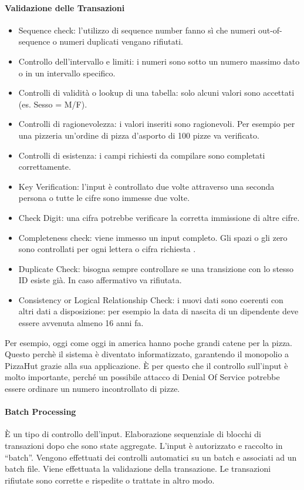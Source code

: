 \paragraph{Validazione delle Transazioni}
\begin{itemize}
	\item Sequence check: l'utilizzo di sequence number fanno sì che numeri
	out-of-sequence o numeri duplicati vengano rifiutati.
	\item Controllo dell'intervallo e limiti: i numeri sono sotto un numero
	massimo dato o in un intervallo specifico.
	\item Controlli di validità o lookup di una tabella:
	solo alcuni valori sono accettati (es. Sesso = M/F).
	\item Controlli di ragionevolezza: i valori inseriti sono ragionevoli.
	Per esempio per una pizzeria un'ordine di pizza d'asporto di 100 pizze
	va verificato.
	\item Controlli di esistenza: i campi richiesti da compilare
	sono completati correttamente.
	\item Key Verification: l'input è controllato due volte attraverso
	una seconda persona o tutte le cifre sono immesse due volte.
	\item Check Digit: una cifra potrebbe verificare la corretta
	immissione di altre cifre.
	\item Completeness check: viene immesso un input completo. Gli
	spazi o gli zero sono controllati per ogni lettera o cifra 
	richiesta .
	\item Duplicate Check: bisogna sempre controllare se una transizione
	con lo stesso ID esiste già. In caso affermativo va rifiutata.
	\item Consistency or Logical Relationship Check: i nuovi dati
	sono coerenti con altri dati a disposizione: per esempio
	la data di nascita di un dipendente deve essere avvenuta almeno
	16 anni fa.
\end{itemize}

Per esempio, oggi come oggi in america hanno poche grandi catene per la pizza.
Questo perchè il sistema è diventato informatizzato, garantendo il monopolio a
PizzaHut grazie alla sua applicazione. È per questo che il controllo sull'input 
è molto importante, perché un possibile attacco di Denial Of Service potrebbe 
essere ordinare un numero incontrollato di pizze.





\paragraph{Batch Processing} 
È un tipo di controllo dell'input.
Elaborazione sequenziale di blocchi di transazioni
dopo che sono state aggregate. 
L'input è autorizzato e raccolto in ``batch''. Vengono effettuati
dei controlli automatici su un batch e associati ad un batch file.
Viene effettuata la validazione della transazione. Le transazioni
rifiutate sono corrette e rispedite o trattate in altro modo.

